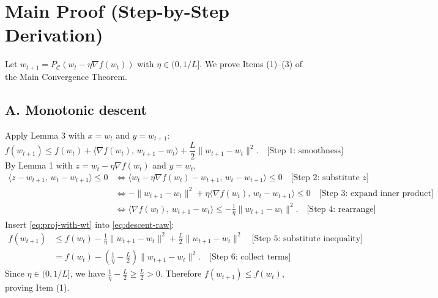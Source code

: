 \documentclass[11pt]{article}
\begin{document}
\section*{Main Proof (Step-by-Step Derivation)}
Let $w_{t+1}=P_{\mathcal{C}}(w_t - \eta \nabla f(w_t))$ with $\eta\in(0,1/L]$. We prove Items (1)--(3) of the Main Convergence Theorem.

\subsection*{A. Monotonic descent}
Apply Lemma 3 with $x=w_t$ and $y=w_{t+1}$:
\begin{equation}
f(w_{t+1}) \le f(w_t) + \langle \nabla f(w_t),\, w_{t+1}-w_t\rangle + \frac{L}{2}\|w_{t+1}-w_t\|^2. \quad \text{[Step 1: smoothness]}
\label{eq:descent-raw}
\end{equation}
By Lemma 1 with $z=w_t-\eta\nabla f(w_t)$ and $y=w_t$,
\begin{align}
\langle z - w_{t+1},\, w_t - w_{t+1}\rangle \le 0 
&\iff \langle w_t - \eta \nabla f(w_t) - w_{t+1},\, w_t - w_{t+1}\rangle \le 0 \quad \text{[Step 2: substitute $z$]} \nonumber\\
&\iff -\|w_{t+1}-w_t\|^2 + \eta \langle \nabla f(w_t),\, w_t - w_{t+1}\rangle \le 0 \quad \text{[Step 3: expand inner product]} \nonumber\\
&\iff \langle \nabla f(w_t),\, w_{t+1}-w_t\rangle \le -\frac{1}{\eta}\|w_{t+1}-w_t\|^2. \quad \text{[Step 4: rearrange]}
\label{eq:proj-with-wt}
\end{align}
Insert \eqref{eq:proj-with-wt} into \eqref{eq:descent-raw}:
\begin{align*}
f(w_{t+1}) 
&\le f(w_t) - \frac{1}{\eta}\|w_{t+1}-w_t\|^2 + \frac{L}{2}\|w_{t+1}-w_t\|^2 \quad \text{[Step 5: substitute inequality]}\\
&= f(w_t) - \left(\frac{1}{\eta}-\frac{L}{2}\right)\|w_{t+1}-w_t\|^2. \quad \text{[Step 6: collect terms]}
\end{align*}
Since $\eta\in(0,1/L]$, we have $\frac{1}{\eta}-\frac{L}{2}\ge \frac{L}{2}>0$. Therefore $f(w_{t+1})\le f(w_t)$, proving Item (1). \quad {}
\end{document}
